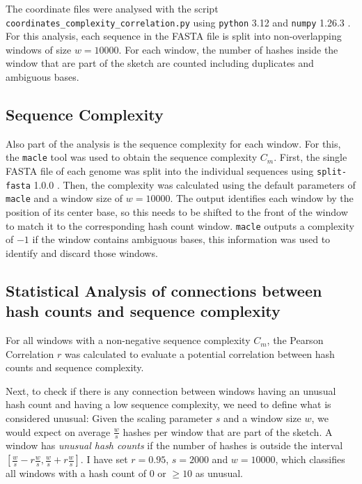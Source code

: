 The coordinate files were analysed with the script
\texttt{coordinates\_complexity\_correlation.py} using \texttt{python} 3.12
\cite{vanrossumPythonReferenceManual2009} and \texttt{numpy} 1.26.3
\cite{ArrayProgrammingNumPy}. For this analysis, each sequence in the FASTA file
is split into non-overlapping windows of size $w=10000$. For each window, the
number of hashes inside the window that are part of the sketch are counted
including duplicates and ambiguous bases.

\subsection*{Sequence Complexity}
Also part of the analysis is the sequence complexity for each window. For this,
the \texttt{macle} tool \cite{pirogovHighcomplexityRegionsMammalian2019} was
used to obtain the sequence complexity $C_m$. First, the single FASTA file of
each genome was split into the individual sequences using \texttt{split-fasta}
1.0.0 \cite{vashishtSplitfasta2020}. Then, the complexity was calculated using
the default parameters of \texttt{macle} and a window size of $w=10000$. The
output identifies each window by the position of its center base, so this needs
to be shifted to the front of the window to match it to the corresponding hash
count window. \texttt{macle} outputs a complexity of $-1$ if the window contains
ambiguous bases, this information was used to identify and discard those
windows.

\subsection*{Statistical Analysis of connections between hash counts and sequence complexity}
For all windows with a non-negative sequence complexity $C_m$, the Pearson
Correlation $r$ was calculated to evaluate a potential correlation between hash
counts and sequence complexity.

Next, to check if there is any connection between windows having an unusual hash
count and having a low sequence complexity, we need to define what is considered
unusual: Given the scaling parameter $s$ and a window size $w$, we would expect
on average $\frac{w}{s}$ hashes per window that are part of the sketch. A window
has \textit{unusual hash counts} if the number of hashes is outside the interval
$[\frac{w}{s} - r \frac{w}{s}, \frac{w}{s} + r \frac{w}{s}]$. I have set
$r=0.95$, $s=2000$ and $w=10000$, which classifies all windows with a hash count
of $0$ or $\geq 10$ as unusual.


